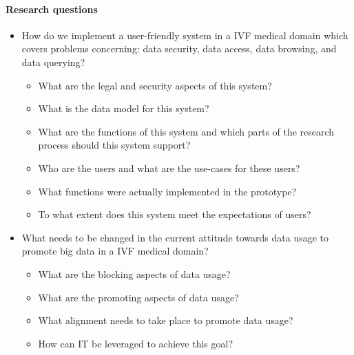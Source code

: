 \paragraph{Research questions}
\begin{itemize}
	\item How do we implement a user-friendly system in a IVF medical domain which covers problems concerning: data security, data access, data browsing, and data querying?
	\begin{itemize}
		\item What are the legal and security aspects of this system?
		\item What is the data model for this system?
		\item What are the functions of this system and which parts of the research process should this system support?
		\item Who are the users and what are the use-cases for these users?
		\item What functions were actually implemented in the prototype?
		\item To what extent does this system meet the expectations of users?
	\end{itemize}
	\item What needs to be changed in the current attitude towards data usage to promote big data in a IVF medical domain?
	\begin{itemize}
		\item What are the blocking aspects of data usage?
		\item What are the promoting aspects of data usage?
		\item What alignment needs to take place to promote data usage?
		\item How can IT be leveraged to achieve this goal?
	\end{itemize}
\end{itemize}